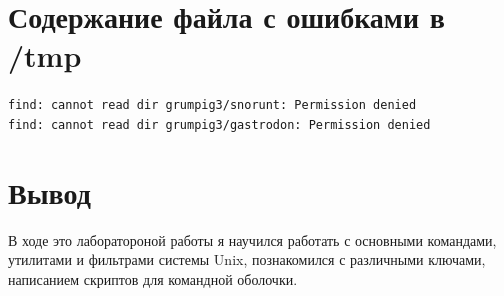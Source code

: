 \documentclass[11pt]{article}
\begin{document}
\begin{enumerate}
\section{Содержание файла с ошибками в /tmp}
\texttt{find: cannot read dir grumpig3/snorunt: Permission denied\\
find: cannot read dir grumpig3/gastrodon: Permission denied}
\large
\section{Вывод}
В ходе это лаборатороной работы я научился работать с основными командами, утилитами и фильтрами системы Unix, познакомился с
различными ключами, написанием скриптов для командной оболочки.
\end{enumerate}
\end{document}
